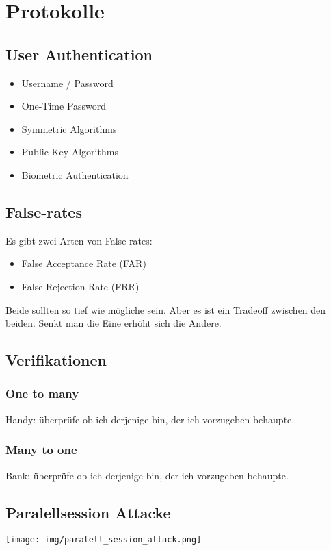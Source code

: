 \documentclass[12pt]{scrartcl}
\begin{document}
\newpage
\section{Protokolle}


\subsection{User Authentication}

\begin{itemize}
    \item Username / Password
    \item One-Time Password
    \item Symmetric Algorithms
    \item Public-Key Algorithms
    \item Biometric Authentication
\end{itemize}

\vspace{0.5cm}
\subsection{False-rates}
Es gibt zwei Arten von False-rates:
\begin{itemize}
    \item False Acceptance Rate (FAR)
    \item False Rejection Rate (FRR)
\end{itemize}

Beide sollten so tief wie mögliche sein. Aber es ist ein Tradeoff zwischen den beiden.
Senkt man die Eine erhöht sich die Andere.


\subsection{Verifikationen}
\subsubsection{One to many}
Handy: überprüfe ob ich derjenige bin, der ich vorzugeben behaupte.


\subsubsection{Many to one}
Bank: überprüfe ob ich derjenige bin, der ich vorzugeben behaupte.


\subsection{Paralellsession Attacke}
\texttt{[image: img/paralell\_session\_attack.png]}
\end{document}
